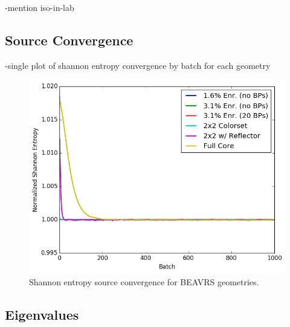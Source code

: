 -mention iso-in-lab

\subsection{Source Convergence}
\label{subsec:chap7-src-converge}

-single plot of shannon entropy convergence by batch for each geometry

\begin{figure}[h!]
  \centering
  \includegraphics[width=0.9\linewidth]{figures/benchmarks/entropy/entropy-all}
\caption[Shannon entropy source convergence for BEAVRS geometries]{Shannon entropy source convergence for BEAVRS geometries.}
\label{fig:chap7-entropy}
\end{figure}



\subsection{Eigenvalues}
\label{subsec:chap7-eigenvalues}

